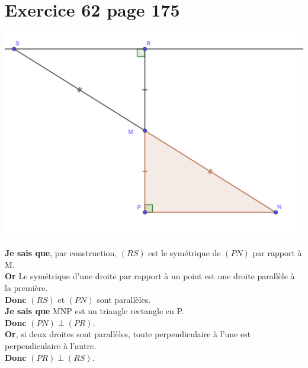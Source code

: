 \documentclass[12pt,a4paper]{article}
\begin{document}
\section*{Exercice 62 page 175}

\begin{center}
	\includegraphics[scale=0.2]{62}
\end{center}

 \noindent \textbf{Je sais que}, par construction, $(RS)$ est le symétrique de $(PN)$ par rapport à M.\\
 \textbf{Or} Le symétrique d'une droite par rapport à un point est une droite parallèle à la première.\\
 \textbf{Donc} $(RS)$ et $(PN)$ sont parallèles.\\
 
 \noindent \textbf{Je sais que} MNP est un triangle rectangle en P.\\
 \textbf{Donc} $(PN) \perp (PR)$.\\
 \textbf{Or}, si deux droites sont parallèles, toute perpendiculaire à l’une est perpendiculaire à l’autre.\\
 \textbf{Donc} $(PR) \perp (RS)$.
\end{document}
